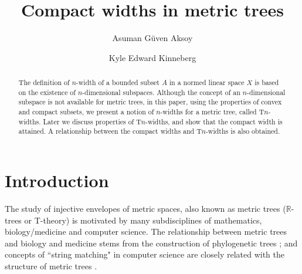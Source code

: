 \documentclass{bcp92}
\theoremstyle{plain}
\theoremstyle{definition}
\begin{document}
\setcounter{page}{15}


\title{Compact widths in metric trees}

\author{Asuman G\"{u}ven Aksoy}
\address{Claremont McKenna College,
Department of Mathematics\\
Claremont, CA 91711, USA\\
E-mail: aaksoy@cmc.edu}

\author{Kyle Edward Kinneberg}
\address{University of California, Los Angeles,
Department of Mathematics\\
Los Angeles, CA 90095, USA\\
E-mail: kkinneberg@math.ucla.edu}

\maketitlebcp

\begin{abstract}
The definition of $n$-width of a bounded subset $A$ in a normed linear space
$X$ is  based on  the existence of $n$-dimensional subspaces. Although the
concept of  an $n$-dimensional subspace is not available for metric trees, in
this paper, using the properties of convex and compact subsets, we present a
notion of  $n$-widths for a  metric tree, called T$n$-widths. Later we
discuss properties of T$n$-widths, and show that the compact width is
attained. A relationship between the compact widths and T$n$-widths is also
obtained.
\end{abstract}

\section{Introduction}
The study of injective envelopes of metric spaces, also known as metric trees
($\mathbb{R}$-trees or T-theory) is motivated by many subdisciplines of
mathematics, biology/medicine and computer science. The relationship between
metric trees and biology and medicine stems from the construction of
phylogenetic trees \cite{ss}; and concepts of ``string matching" in computer
science are closely related with the structure of metric trees \cite{bcp}.
\end{document}
